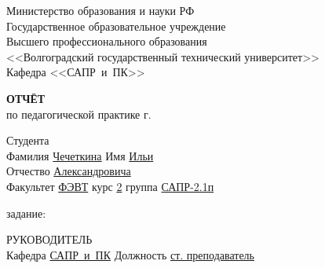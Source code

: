 \documentclass[a4paper, 14pt]{extreport}
\begin{document}
    \begin{titlepage}
        \begin{center}
            Министерство образования и науки РФ \\
            Государственное образовательное учреждение\\
            Высшего профессионального образования\\
            <<Волгоградский государственный технический университет>>\\
            Кафедра <<САПР~и~ПК>>
        \end{center}
        \vspace{2.0cm}
        \begin{center}
            \large \textbf{ОТЧЁТ} \\
            по педагогической практике \the\year г.
        \end{center}
        \begin{flushleft}
            Студента\\
            Фамилия \underline{Чечеткина\hspace{2.825cm}}
            Имя \underline{Ильи\hspace{2.7cm}}\\
            Отчество \underline{Александровича\hspace{1.5cm}}\\
            Факультет \underline{ФЭВТ\hspace{3.45cm}} курс \underline{2\hspace{1.5cm}} 
            группа \underline{САПР-2.1п\hspace{1.9cm}}\\
        \end{flushleft}
        \vspace{1.0cm}
         задание: \underline{\hspace{22.3em}}\\
        \underline{\hspace{\textwidth}}
        \underline{\hspace{\textwidth}}
        \underline{\hspace{\textwidth}}
        \underline{\hspace{\textwidth}}
        \vspace{2.0cm}
        \begin{flushleft}
            РУКОВОДИТЕЛЬ\\
            Кафедра \underline{САПР~и~ПК\hspace{2.4cm}} Должность \underline{ст. преподаватель\hspace{2.45em}} \\

\end{flushleft}
\end{titlepage}
\end{document}
